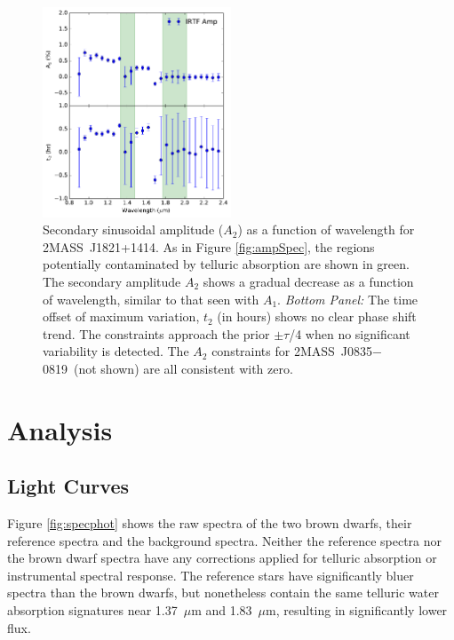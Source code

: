 \documentclass[twocolumn]{aastex6}
\newcommand{\sha}{2MASS~J0835$-$0819}
\newcommand{\shb}{2MASS~J1821+1414}
\begin{document}
\begin{figure}
\begin{centering}
\includegraphics[width=0.5\textwidth]{amp_vs_wavl_j1821_a2_t2.pdf}
\caption{Secondary sinusoidal amplitude ($A_2$) as a function of wavelength for \shb.
As in Figure \ref{fig:ampSpec}, the regions potentially contaminated by telluric absorption are shown in green.
The secondary amplitude $A_2$ shows a gradual decrease as a function of wavelength, similar to that seen with $A_1$.
{\it Bottom Panel:} The time offset of maximum variation, $t_2$ (in hours) shows no clear phase shift trend.
The constraints approach the prior $\pm \tau$/4 when no significant variability is detected.
The $A_2$ constraints for \sha\ (not shown) are all consistent with zero.}\label{fig:amp2Spec}
\end{centering}
\end{figure}



\section{Analysis}\label{sec:analysis}

\subsection{Light Curves}

Figure \ref{fig:specphot} shows the raw spectra of the two brown dwarfs, their reference spectra and the background spectra.
Neither the reference spectra nor the brown dwarf spectra have any corrections applied for telluric absorption or instrumental spectral response.
The reference stars have significantly bluer spectra than the brown dwarfs, but nonetheless contain the same telluric water absorption signatures
near 1.37~$\mu$m and 1.83~$\mu$m, resulting in significantly lower flux.
\end{document}
